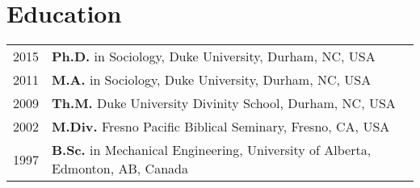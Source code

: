 \section*{Education}
\begin{longtable}{p{} p{}}
2015 & \textbf{Ph.D.} in Sociology, Duke University, Durham, NC, USA\\
2011 & \textbf{M.A.} in Sociology, Duke University, Durham, NC, USA \\
2009 & \textbf{Th.M.} Duke University Divinity School, Durham, NC, USA \\
2002 & \textbf{M.Div.} Fresno Pacific Biblical Seminary, Fresno, CA, USA \\
1997 & \textbf{B.Sc.} in Mechanical Engineering, University of Alberta, Edmonton, AB, Canada \\
\end{longtable}
